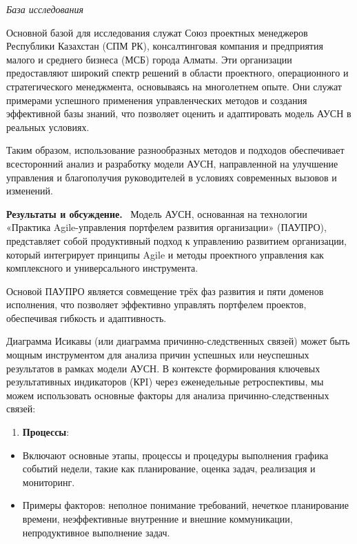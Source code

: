 \begin{multicols}{2}
\emph{База исследования}

Основной базой для исследования служат Союз проектных менеджеров
Республики Казахстан (СПМ РК), консалтинговая компания и предприятия
малого и среднего бизнеса (МСБ) города Алматы. Эти организации
предоставляют широкий спектр решений в области проектного, операционного
и стратегического менеджмента, основываясь на многолетнем опыте. Они
служат примерами успешного применения управленческих методов и создания
эффективной базы знаний, что позволяет оценить и адаптировать модель
АУСН в реальных условиях.

Таким образом, использование разнообразных методов и подходов
обеспечивает всесторонний анализ и разработку модели АУСН, направленной
на улучшение управления и благополучия руководителей в условиях
современных вызовов и изменений.

{\bfseries Результаты и обсуждение.}~ Модель АУСН, основанная на технологии
«Практика Agile-управления портфелем развития организации» (ПАУПРО),
представляет собой продуктивный подход к управлению развитием
организации, который интегрирует принципы Agile и методы проектного
управления как комплексного и универсального инструмента.

Основой ПАУПРО является совмещение трёх фаз развития и пяти доменов
исполнения, что позволяет эффективно управлять портфелем проектов,
обеспечивая гибкость и адаптивность.

Диаграмма Исикавы (или диаграмма причинно-следственных связей) может
быть мощным инструментом для анализа причин успешных или неуспешных
результатов в рамках модели АУСН. В контексте формирования ключевых
результативных индикаторов (КРI) через еженедельные ретроспективы, мы
можем использовать основные факторы для анализа причинно-следственных
связей:

\begin{enumerate}
\def\labelenumi{\arabic{enumi}.}
\item
  {\bfseries Процессы}:
\end{enumerate}

\begin{itemize}
\item
  Включают основные этапы, процессы и процедуры выполнения графика
  событий недели, такие как планирование, оценка задач, реализация и
  мониторинг.
\item
  Примеры факторов: неполное понимание требований, нечеткое планирование
  времени, неэффективные внутренние и внешние коммуникации,
  непродуктивное выполнение задач.
\end{itemize}


\end{multicols}
